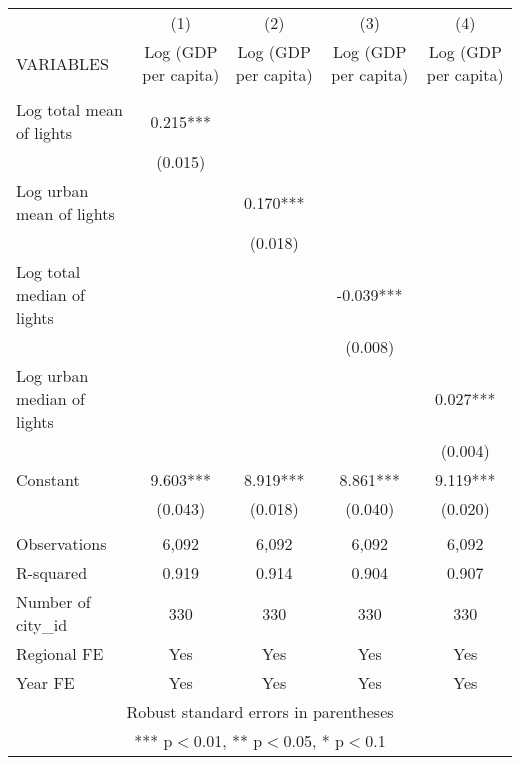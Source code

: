\documentclass[]{article}
\begin{document}
\begin{tabular}{lcccc} \hline
 & (1) & (2) & (3) & (4) \\
VARIABLES & Log (GDP per capita) & Log (GDP per capita) & Log (GDP per capita) & Log (GDP per capita) \\ \hline
 &  &  &  &  \\
Log total mean of lights & 0.215*** &  &  &  \\
 & (0.015) &  &  &  \\
Log urban mean of lights &  & 0.170*** &  &  \\
 &  & (0.018) &  &  \\
Log total median of lights &  &  & -0.039*** &  \\
 &  &  & (0.008) &  \\
Log urban median of lights &  &  &  & 0.027*** \\
 &  &  &  & (0.004) \\
Constant & 9.603*** & 8.919*** & 8.861*** & 9.119*** \\
 & (0.043) & (0.018) & (0.040) & (0.020) \\
 &  &  &  &  \\
Observations & 6,092 & 6,092 & 6,092 & 6,092 \\
R-squared & 0.919 & 0.914 & 0.904 & 0.907 \\
Number of city\_id & 330 & 330 & 330 & 330 \\
Regional FE & Yes & Yes & Yes & Yes \\
 Year FE & Yes & Yes & Yes & Yes \\ \hline
\multicolumn{5}{c}{ Robust standard errors in parentheses} \\
\multicolumn{5}{c}{ *** p$<$0.01, ** p$<$0.05, * p$<$0.1} \\
\end{tabular}
\end{document}
